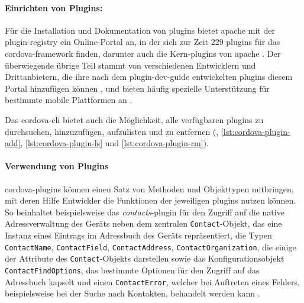 {\paragraph{Einrichten von Plugins:}

Für die Installation und Dokumentation von \glspl{plugin} bietet \gls{apache} mit der \gls{plugin-registry} ein Online-Portal an, in der sich zur Zeit 229 \glspl{plugin} für das \gls{cordova}-\gls{framework} finden, darunter auch die \og Kern-\glspl{plugin} von \gls{apache} \cite{Cordova_Docs_Plugin_APIs}. Der überwiegende übrige Teil stammt von verschiedenen Entwicklern und Drittanbietern, die ihre nach dem \gls{plugin-dev-guide} entwickelten \glspl{plugin} diesem Portal hinzufügen können \cite{Cordova_Plugin_Development_Guide}, und bieten häufig spezielle Unterstützung für bestimmte mobile Plattformen an \cite{Cordova_Plugin_Registry_viewAll}.

Das \gls{cordova}-\gls{cli} bietet auch die Möglichkeit, alle verfügbaren \glspl{plugin} zu durchsuchen, hinzuzufügen, aufzulisten und zu entfernen (, \ref{lst:cordova-plugin-add}, \ref{lst:cordova-plugin-ls} und \ref{lst:cordova-plugin-rm}).






\paragraph{Verwendung von Plugins}	\label{sec:cordova-plugins-verwendung}

\gls{cordova}-\glspl{plugin} können einen Satz von Methoden und Objekttypen mitbringen, mit deren Hilfe Entwickler die Funktionen der jeweiligen \glspl{plugin} nutzen können.
So beinhaltet beispielsweise das \emph{contacts}-\gls{plugin} für den Zugriff auf die native Adressverwaltung des Geräts neben dem zentralen \lstinline|Contact|-Objekt, das eine Instanz eines Eintrags im Adressbuch des Geräts repräsentiert, die Typen \mbox{\lstinline|ContactName|,} \mbox{\lstinline|ContactField|,} \mbox{\lstinline|ContactAddress|,} \mbox{\lstinline|ContactOrganization|,} die einige der Attribute des \lstinline|Contact|-Objekts darstellen sowie das Konfigurationsobjekt \mbox{\lstinline|ContactFindOptions|,} das bestimmte Optionen für den Zugriff auf das Adressbuch kapselt und einen \mbox{\lstinline|ContactError|,} welcher bei Auftreten eines Fehlers, beispielsweise bei der Suche nach Kontakten, behandelt werden kann \cite{Cordova_Plugin_Registry_Contacts}.

}

